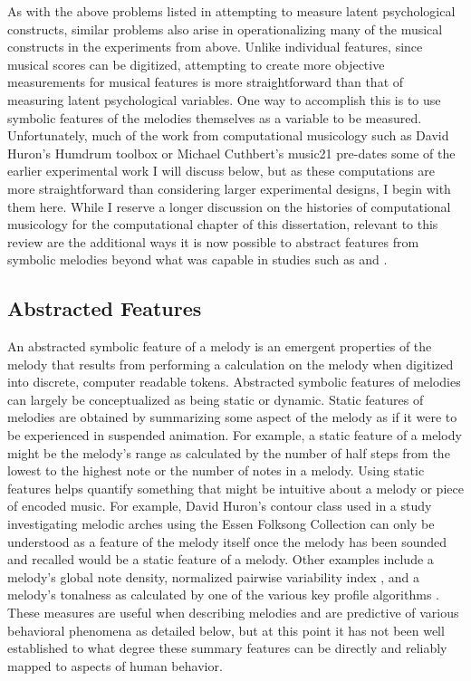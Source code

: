 \documentclass[12pt,]{book}
\begin{document}
As with the above problems listed in attempting to measure latent psychological constructs, similar problems also arise in operationalizing many of the musical constructs in the experiments from above.
Unlike individual features, since musical scores can be digitized, attempting to create more objective measurements for musical features is more straightforward than that of measuring latent psychological variables.
One way to accomplish this is to use symbolic features of the melodies themselves as a variable to be measured.
Unfortunately, much of the work from computational musicology such as David Huron's Humdrum toolbox \citep{huronHumdrumToolkitReference1994} or Michael Cuthbert's music21 \citep{cuthbertMusic21ToolkitComputerAided2010} pre-dates some of the earlier experimental work I will discuss below, but as these computations are more straightforward than considering larger experimental designs, I begin with them here.
While I reserve a longer discussion on the histories of computational musicology for the computational chapter of this dissertation, relevant to this review are the additional ways it is now possible to abstract features from symbolic melodies beyond what was capable in studies such as \citet{ortmannTonalDeterminantsMelodic1933} and \citet{taylorStrategiesMemoryShort1983}.

\hypertarget{abstracted-features}{%
\subsection{Abstracted Features}\label{abstracted-features}}

An abstracted symbolic feature of a melody is an emergent properties of the melody that results from performing a calculation on the melody when digitized into discrete, computer readable tokens.
Abstracted symbolic features of melodies can largely be conceptualized as being static or dynamic.
Static features of melodies are obtained by summarizing some aspect of the melody as if it were to be experienced in suspended animation.
For example, a static feature of a melody might be the melody's range as calculated by the number of half steps from the lowest to the highest note or the number of notes in a melody.
Using static features helps quantify something that might be intuitive about a melody or piece of encoded music.
For example, David Huron's contour class used in a study investigating melodic arches \citep{huronMelodicArchWestern1996} using the Essen Folksong Collection \citep{schaffrathEssenFolkSong1995} can only be understood as a feature of the melody itself once the melody has been sounded and recalled would be a static feature of a melody.
Other examples include a melody's global note density, normalized pairwise variability index \citep{grabeDurationalVariabilitySpeech2002}, and a melody's tonalness as calculated by one of the various key profile algorithms \citep{krumhanslCognitiveFoundationsMusical2001, albrechtUseLargeCorpora2013}.
These measures are useful when describing melodies and are predictive of various behavioral phenomena as detailed below, but at this point it has not been well established to what degree these summary features can be directly and reliably mapped to aspects of human behavior.
\end{document}
